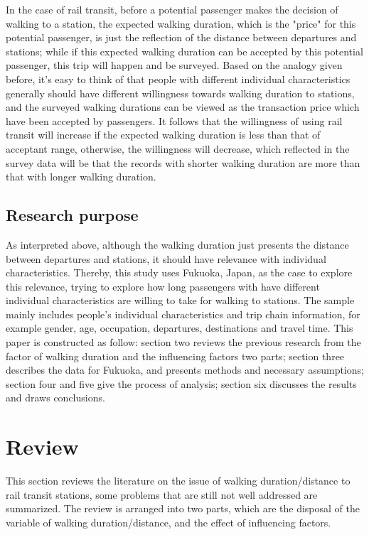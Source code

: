 In the case of rail transit, before a potential passenger makes the decision of walking to a station, the expected walking duration, which is the "price" for this potential passenger, is just the reflection of the distance between departures and stations; while if this expected walking duration can be accepted by this potential passenger, this trip will happen and be surveyed. Based on the analogy given before, it's easy to think of that people with different individual characteristics generally should have different willingness towards walking duration to stations, and the surveyed walking durations can be viewed as the transaction price which have been accepted by passengers. It follows that the willingness of using rail transit will increase if the expected walking duration is less than that of acceptant range, otherwise, the willingness will decrease, which reflected in the survey data will be that the records with shorter walking duration are more than that with longer walking duration. 

\subsection{Research purpose}
As interpreted above, although the walking duration just presents the distance between departures and stations, it should have relevance with individual characteristics. Thereby, this study uses Fukuoka, Japan, as the case to explore this relevance, trying to explore how long passengers with have different individual characteristics are willing to take for walking to stations. The sample mainly includes people's individual characteristics and trip chain information, for example gender, age, occupation, departures, destinations and travel time. This paper is constructed as follow: section two reviews the previous research from the factor of walking duration and the influencing factors two parts;  section three describes the data for Fukuoka, and presents methods and necessary assumptions; section four and five give the process of analysis; section six discusses the results and draws conclusions. 

%
\section{Review}
This section reviews the literature on the issue of walking duration/distance to rail transit stations, some problems that are still not well addressed are summarized. The review is arranged into two parts, which are the disposal of the variable of walking duration/distance, and the effect of influencing factors.

